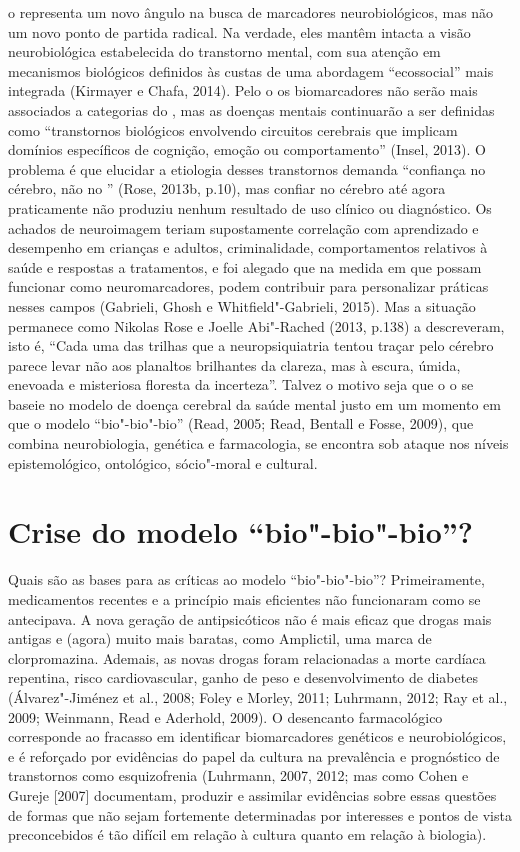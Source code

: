 o representa um novo ângulo na busca de marcadores neurobiológicos,
mas não um novo ponto de partida radical. Na verdade, eles mantêm
intacta a visão neurobiológica estabelecida do transtorno mental, com
sua atenção em mecanismos biológicos definidos às custas de uma
abordagem ``ecossocial'' mais integrada (Kirmayer e Chafa, 2014). Pelo
o os biomarcadores não serão mais associados a categorias do
\emph{}, mas as doenças mentais continuarão a ser definidas como
``transtornos biológicos envolvendo circuitos cerebrais que implicam
domínios específicos de cognição, emoção ou comportamento'' (Insel,
2013). O problema é que elucidar a etiologia desses transtornos demanda
``confiança no cérebro, não no '' (Rose, 2013b, p.10), mas confiar no
cérebro até agora praticamente não produziu nenhum resultado de uso
clínico ou diagnóstico. Os achados de neuroimagem teriam supostamente
correlação com aprendizado e desempenho em crianças e adultos,
criminalidade, comportamentos relativos à saúde e respostas a
tratamentos, e foi alegado que na medida em que possam funcionar como
neuromarcadores, podem contribuir para personalizar práticas nesses
campos (Gabrieli, Ghosh e Whitfield"-Gabrieli, 2015). Mas a situação
permanece como Nikolas Rose e Joelle Abi"-Rached (2013, p.138) a
descreveram, isto é, ``Cada uma das trilhas que a neuropsiquiatria
tentou traçar pelo cérebro parece levar não aos planaltos brilhantes da
clareza, mas à escura, úmida, enevoada e misteriosa floresta da
incerteza''. Talvez o motivo seja que o o se baseie no modelo de
doença cerebral da saúde mental justo em um momento em que o modelo
``bio"-bio"-bio'' (Read, 2005; Read, Bentall e Fosse, 2009), que combina
neurobiologia, genética e farmacologia, se encontra sob ataque nos
níveis epistemológico, ontológico, sócio"-moral e cultural.

\chapter{Crise do modelo ``bio"-bio"-bio''?}

Quais são as bases para as críticas ao modelo ``bio"-bio"-bio''?
Primeiramente, medicamentos recentes e a princípio mais eficientes não
funcionaram como se antecipava. A nova geração de antipsicóticos não é
mais eficaz que drogas mais antigas e (agora) muito mais baratas, como
Amplictil, uma marca de clorpromazina. Ademais, as novas drogas foram
relacionadas a morte cardíaca repentina, risco cardiovascular, ganho de
peso e desenvolvimento de diabetes (Álvarez"-Jiménez et al., 2008; Foley
e Morley, 2011; Luhrmann, 2012; Ray et al., 2009; Weinmann, Read e
Aderhold, 2009). O desencanto farmacológico corresponde ao fracasso em
identificar biomarcadores genéticos e neurobiológicos, e é reforçado por
evidências do papel da cultura na prevalência e prognóstico de
transtornos como esquizofrenia (Luhrmann, 2007, 2012; mas como Cohen e
Gureje {[}2007{]} documentam, produzir e assimilar evidências sobre
essas questões de formas que não sejam fortemente determinadas por
interesses e pontos de vista preconcebidos é tão difícil em relação à
cultura quanto em relação à biologia).

